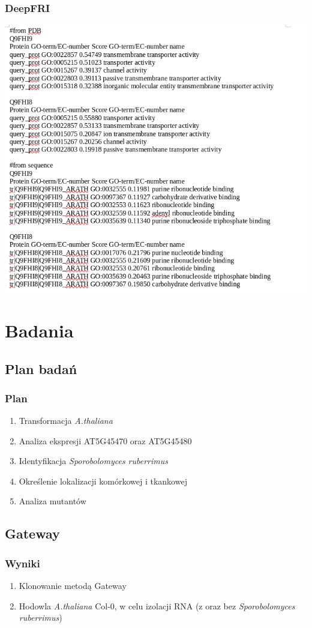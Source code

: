 \documentclass{beamer}
\begin{document}
\begin{frame}
    \frametitle{DeepFRI}
    \includegraphics[scale=0.35]{deepfri.png}
\end{frame}

\section{Badania}

\subsection{Plan badań}
\begin{frame}
    \frametitle{Plan}
    \begin{enumerate}
        \item Transformacja \textit{A.thaliana}
        \item Analiza ekspresji AT5G45470 oraz AT5G45480
        \item Identyfikacja \textit{Sporobolomyces ruberrimus}
        \item Określenie lokalizacji komórkowej i tkankowej
        \item Analiza mutantów
    \end{enumerate}
\end{frame}

\subsection{Gateway}
\begin{frame}
    \frametitle{Wyniki}
    \begin{enumerate}
        \item Klonowanie metodą Gateway
        \item Hodowla \textit{A.thaliana} Col-0, w celu izolacji RNA (z oraz bez \textit{Sporobolomyces ruberrimus})
    \end{enumerate}
\end{frame}
\end{document}
